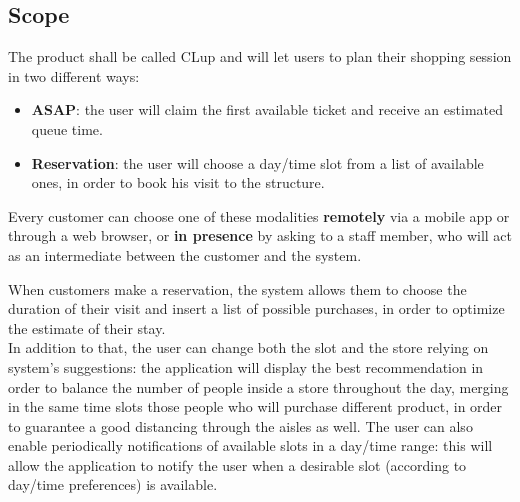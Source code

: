 \documentclass[table, 12pt]{article}
\begin{document}
\subsection{Scope}
The product shall be called CLup and will let users to plan their shopping session in two different ways:
\begin{itemize}
    \item {\textbf{ASAP}: the user will claim the first available ticket and receive an estimated queue time.}
    \item {\textbf{Reservation}: the user will choose a day/time slot from a list of available ones, in order to book his visit to the structure.}
\end{itemize}

Every customer can choose one of these modalities \textbf{remotely} via a mobile app or through a web browser, or \textbf{in presence} by asking to a staff member, who will act as an intermediate between the customer and the system.

When customers make a reservation, the system allows them to choose the duration of their visit and insert a list of possible purchases, in order to optimize the estimate of their stay.\\

In addition to that, the user can change both the slot and the store relying on system's suggestions: the application will display the best recommendation in order to balance the number of people inside a store throughout the day, merging in the same time slots those people who will purchase different product, in order to guarantee a good distancing through the aisles as well. The user can also enable periodically notifications of available slots in a day/time range: this will allow the application to notify the user when a desirable slot (according to day/time preferences) is available.
\end{document}

